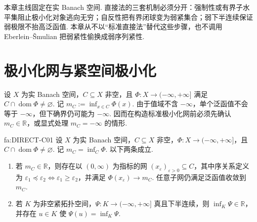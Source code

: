 本章主线固定在实 Banach 空间. 直接法的三套机制必须分开：强制性或有界子水平集阻止极小化对象逃向无穷；自反性把有界闭球变为弱紧集合；弱下半连续保证弱极限不抬高泛函值. 本章从不以“标准直接法”替代这些步骤，也不调用 Eberlein--Šmulian 把弱紧性偷换成弱序列紧性.

\section{极小化网与紧空间极小化}\label{sec:iii07-minimizing}

设 \(\displaystyle X\) 为实 Banach 空间，\(\displaystyle C\subseteq X\) 非空，且 \(\displaystyle\Phi:X\to(-\infty,+\infty]\) 满足 \(\displaystyle C\cap\operatorname{dom}\Phi\neq\varnothing\). 记
\(\displaystyle m_C:=\inf_{x\in C}\Phi(x)\).
由于值域不含 \(\displaystyle-\infty\)，单个泛函值不会等于 \(\displaystyle-\infty\)，但下确界仍可能为 \(\displaystyle-\infty\). 因而在构造标准极小化网前必须先确认 \(\displaystyle m_C\in\mathbb R\)，或显式处理 \(\displaystyle m_C=-\infty\) 的情形.

\begin{FAProposition}[C][极小化网与紧空间上的下半连续极小化]{fa:DIRECT-C01}
设 \(\displaystyle X\) 为实 Banach 空间，\(\displaystyle C\subseteq X\) 非空，\(\displaystyle\Phi:X\to(-\infty,+\infty]\)，且 \(\displaystyle C\cap\operatorname{dom}\Phi\neq\varnothing\). 记 \(\displaystyle m_C=\inf_C\Phi\). 以下两条成立.
\begin{enumerate}
\item 若 \(\displaystyle m_C\in\mathbb R\)，则存在以 \(\displaystyle(0,\infty)\) 为指标的网 \(\displaystyle(x_\varepsilon)_{\varepsilon>0}\subseteq C\)，其中序关系定义为 \(\displaystyle\varepsilon_1\preceq\varepsilon_2\iff\varepsilon_1\geqslant\varepsilon_2\)，并满足 \(\displaystyle\Phi(x_\varepsilon)\to m_C\). 任意子网仍满足泛函值收敛到 \(\displaystyle m_C\).
\item 若 \(\displaystyle K\) 为非空紧拓扑空间，\(\displaystyle\Psi:K\to(-\infty,+\infty]\) 真且下半连续，则 \(\displaystyle\inf_K\Psi\in\mathbb R\)，并存在 \(\displaystyle u\in K\) 使 \(\displaystyle\Psi(u)=\inf_K\Psi\).
\end{enumerate}
\end{FAProposition}

